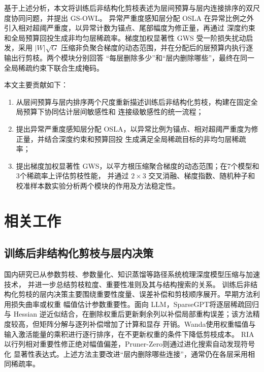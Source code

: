 \documentclass[UTF8,fontset=fandol]{ctexart}
\newcommand{\method}{GS-OWL}
\begin{document}
基于上述分析，本文将训练后非结构化剪枝表述为层间预算与层内连接排序的双尺度协同问题，并提出 \method。
异常严重度感知层分配 OSLA 在异常比例之外引入相对超阈严重度，以异常计数为锚点、尾部幅度为修正量，再通过
深度约束和全局预算回投生成非均匀层稀疏率。梯度加权显著性 GWS 受一阶损失扰动启发，采用
$\lvert W\rvert\sqrt{G}$ 压缩非负聚合梯度的动态范围，并在分配后的层预算内执行逐输出行剪枝。两个模块分别回答
“每层删除多少”和“层内删除哪些”，最终在同一全局稀疏约束下联合生成掩码。

本文主要贡献如下：
\begin{enumerate}[leftmargin=2.2em,itemsep=1pt,topsep=2pt]
  \item 从层间预算与层内排序两个尺度重新描述训练后非结构化剪枝，构建在固定全局预算下协同估计层间敏感性和
  连接级敏感性的统一流程；
  \item 提出异常严重度感知层分配 OSLA，以异常比例为锚点、相对超阈严重度为修正量，并结合深度约束和预算回投
  生成满足全局稀疏目标的非均匀层稀疏率；
  \item 提出梯度加权显著性 GWS，以平方根压缩聚合梯度的动态范围；在7个模型和3个稀疏率上评估剪枝性能，
  并通过 $2\times3$ 交叉消融、梯度指数、随机种子和校准样本数实验分析两个模块的作用及方法稳定性。
\end{enumerate}

\section{相关工作}

\subsection{训练后非结构化剪枝与层内决策}

国内研究已从参数剪枝、参数量化、知识蒸馏等路径系统梳理深度模型压缩与加速技术\cite{gao2021compression}，
并进一步总结剪枝粒度、重要性准则及其与结构搜索的关系\cite{mao2023pruning}。
训练后非结构化剪枝的层内决策主要围绕重要性度量、误差补偿和剪枝顺序展开。早期方法利用损失曲率或权重
幅值估计参数重要性\cite{obd,obs,han2015}。面向 LLM，SparseGPT\cite{sparsegpt}将逐层稀疏回归与 Hessian
逆近似结合，在删除权重后更新剩余列以补偿局部重构误差；该方法精度较高，但矩阵分解与逐列补偿增加了计算和显存
开销。Wanda\cite{wanda}使用权重幅值与输入激活能量的乘积进行逐行排序，在不更新权重的条件下降低剪枝成本。
RIA\cite{ria}以行列相对重要性修正绝对幅值偏差，Pruner-Zero\cite{prunerzero}则通过进化搜索自动发现符号化
显著性表达式。上述方法主要改进“层内删除哪些连接”，通常仍在各层采用相同稀疏率。
\end{document}
